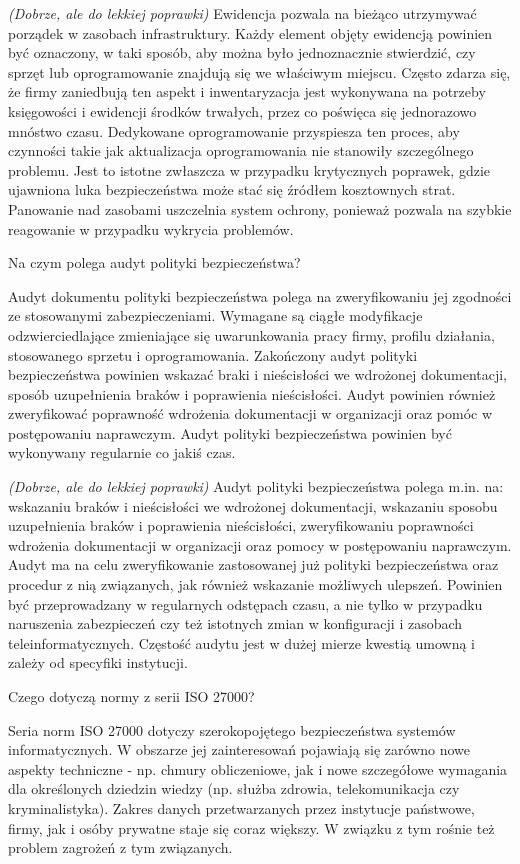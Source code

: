 \documentclass[answers,11pt]{exam}
\newcommand{\fixit}{\textit{(Dobrze, ale do lekkiej poprawki)} }
\begin{document}
\begin{questions}
\begin{solution}
\fixit
Ewidencja pozwala na bieżąco utrzymywać porządek w zasobach infrastruktury. Każdy element objęty ewidencją powinien być oznaczony, w taki sposób, aby można było jednoznacznie stwierdzić, czy sprzęt lub oprogramowanie znajdują się we właściwym miejscu. Często zdarza się, że firmy zaniedbują ten aspekt i inwentaryzacja jest wykonywana na potrzeby księgowości i ewidencji środków trwałych, przez co poświęca się jednorazowo mnóstwo czasu. Dedykowane oprogramowanie przyspiesza ten proces, aby czynności takie jak aktualizacja oprogramowania nie stanowiły szczególnego problemu. Jest to istotne zwłaszcza w przypadku krytycznych poprawek, gdzie ujawniona luka bezpieczeństwa może stać się źródłem kosztownych strat. Panowanie nad zasobami uszczelnia system ochrony, ponieważ pozwala na szybkie reagowanie w przypadku wykrycia problemów.
\end{solution}

\question Na czym polega audyt polityki bezpieczeństwa?
\begin{solution}
Audyt dokumentu polityki bezpieczeństwa polega na zweryfikowaniu jej zgodności ze stosowanymi zabezpieczeniami. Wymagane są ciągłe modyfikacje odzwierciedlające zmieniające się uwarunkowania pracy firmy, profilu działania, stosowanego sprzetu i oprogramowania. Zakończony audyt polityki bezpieczeństwa powinien wskazać braki i nieścisłości we wdrożonej dokumentacji, sposób uzupełnienia braków i poprawienia nieścisłości. Audyt powinien również zweryfikować poprawność wdrożenia dokumentacji w organizacji oraz pomóc w postępowaniu naprawczym. Audyt polityki bezpieczeństwa powinien być wykonywany regularnie co jakiś czas.

\fixit
Audyt polityki bezpieczeństwa polega m.in. na: wskazaniu braków i nieścisłości we wdrożonej dokumentacji, wskazaniu sposobu uzupełnienia braków i poprawienia nieścisłości, zweryfikowaniu poprawności wdrożenia dokumentacji w organizacji oraz pomocy w postępowaniu naprawczym. Audyt ma na celu zweryfikowanie zastosowanej już polityki bezpieczeństwa oraz procedur z nią związanych, jak również wskazanie możliwych ulepszeń. Powinien być przeprowadzany w regularnych odstępach czasu, a nie tylko w przypadku naruszenia zabezpieczeń czy też istotnych zmian w konfiguracji i zasobach teleinformatycznych. Częstość audytu jest w dużej mierze kwestią umowną i zależy od specyfiki instytucji.
\end{solution}

\question Czego dotyczą normy z serii ISO 27000?
\begin{solution}
Seria norm ISO 27000 dotyczy szerokopojętego bezpieczeństwa systemów informatycznych. W obszarze jej zainteresowań pojawiają się zarówno nowe aspekty techniczne  - np. chmury obliczeniowe, jak i nowe szczegółowe wymagania dla określonych dziedzin wiedzy (np. służba zdrowia, telekomunikacja czy kryminalistyka). Zakres danych przetwarzanych przez instytucje państwowe, firmy, jak i osóby prywatne staje się coraz większy. W związku z tym rośnie też problem zagrożeń z tym związanych. 
\end{solution}



\end{questions}
\end{document}
